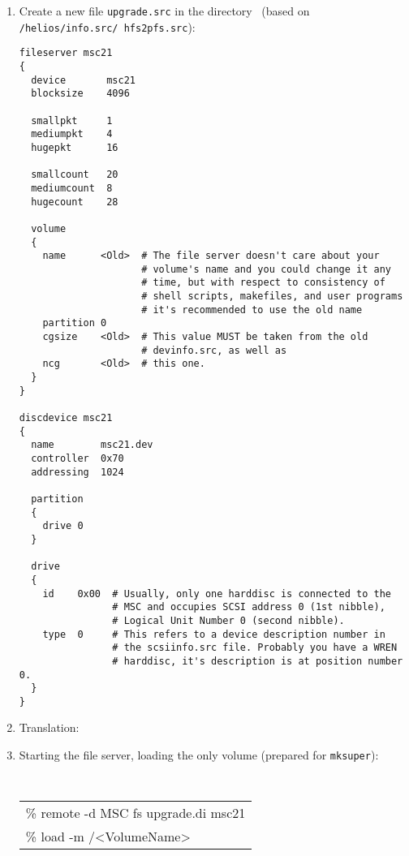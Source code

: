 \begin{enumerate}

  \item Create a new file {\tt upgrade.src}
        in the directory \HE\ (based on {\tt /helios\slash info.src\slash
        hfs2pfs.src}):

\begin{listing}
  \begin{verbatim}
fileserver msc21
{
  device       msc21
  blocksize    4096

  smallpkt     1
  mediumpkt    4
  hugepkt      16

  smallcount   20
  mediumcount  8
  hugecount    28

  volume
  {
    name      <Old>  # The file server doesn't care about your
                     # volume's name and you could change it any
                     # time, but with respect to consistency of
                     # shell scripts, makefiles, and user programs
                     # it's recommended to use the old name
    partition 0
    cgsize    <Old>  # This value MUST be taken from the old
                     # devinfo.src, as well as
    ncg       <Old>  # this one.
  }
}

discdevice msc21
{
  name        msc21.dev
  controller  0x70
  addressing  1024

  partition
  {
    drive 0
  }

  drive
  {
    id    0x00  # Usually, only one harddisc is connected to the
                # MSC and occupies SCSI address 0 (1st nibble),
                # Logical Unit Number 0 (second nibble).
    type  0     # This refers to a device description number in
                # the scsiinfo.src file. Probably you have a WREN
                # harddisc, it's description is at position number 0.
  }
}
  \end{verbatim}
\end{listing}

  \item Translation: \\


  \item Starting the file server, loading the only volume (prepared for
        {\tt mksuper}): \\

          {\tt
            \begin{tabular}{|l|}
              \hline
              \% remote -d MSC fs upgrade.di msc21 \\
              \% load -m /<VolumeName>             \\
              \hline
            \end{tabular}
          }


\end{enumerate}
